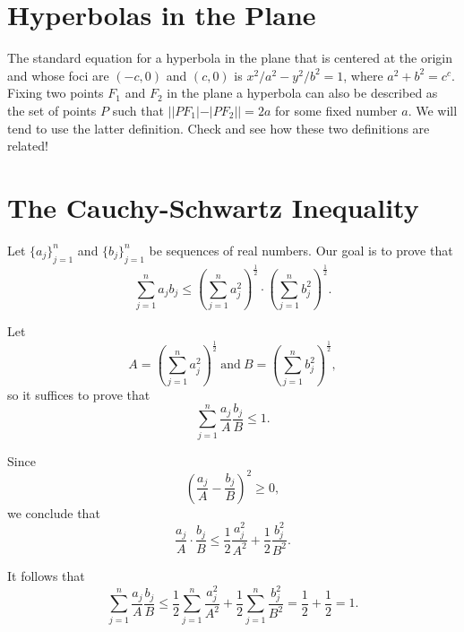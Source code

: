 \documentclass[]{amsart}
\numberwithin{equation}{section}
\theoremstyle{plain}
\theoremstyle{definition}
\theoremstyle{remark}
\begin{document}
\section{Hyperbolas in the Plane }

The standard equation for a hyperbola in the plane that is centered at the origin and whose foci are $(-c,0)$ and $(c,0)$ is $x^2/a^2-y^2/b^2=1$, where $a^2+b^2=c^c$.  Fixing two points $F_1$ and $F_2$ in the plane a hyperbola can also be described as the set of points $P$ such that  $| |PF_1|-|PF_2|| = 2a$ for some fixed number $a$.  We will tend to use the latter definition.  Check and see how these two definitions are related!


\section{The Cauchy-Schwartz Inequality }


Let ${\{a_j\}}_{j=1}^n$ and ${\{b_j\}}_{j=1}^n$ be sequences of real numbers.
Our goal is to prove that
\begin{equation}
\sum_{j=1}^n a_jb_j \leq {\left(\sum_{j=1}^n a_j^2 \right)}^{\frac{1}{2}}
\cdot {\left( \sum_{j=1}^n b_j^2 \right)}^{\frac{1}{2}}.
\end{equation}



Let
\begin{equation}
A={\left(\sum_{j=1}^n a_j^2 \right)}^{\frac{1}{2}}  \  \text{and} \
B={\left(\sum_{j=1}^n b_j^2 \right)}^{\frac{1}{2}} ,
\end{equation}
so it
suffices to prove that
\begin{equation}
\sum_{j=1}^n \frac{a_j}{A} \frac{b_j}{B} \leq 1.
\end{equation}



Since
\begin{equation}
 {\left( \frac{a_j}{A}-\frac{b_j}{B} \right)}^2 \ge 0,
\end{equation}
we
conclude that
\begin{equation}
\frac{a_j}{A} \cdot \frac{b_j}{B} \leq \frac{1}{2}\frac{a_j^2}{A^2}
+\frac{1}{2} \frac{b_j^2}{B^2}.
\end{equation}



It follows that
\begin{equation}
\sum_{j=1}^n \frac{a_j}{A} \frac{b_j}{B} \leq
\frac{1}{2} \sum_{j=1}^n \frac{a_j^2}{A^2}+
\frac{1}{2} \sum_{j=1}^n \frac{b_j^2}{B^2}=\frac{1}{2}+\frac{1}{2}=1.
\end{equation}
\end{document}
